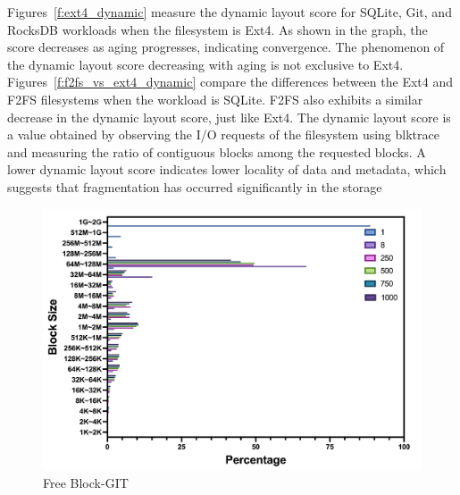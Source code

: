 Figures~\ref{f:ext4_dynamic} measure the dynamic layout score for SQLite, Git, and RocksDB workloads when the filesystem is Ext4.
As shown in the graph, the score decreases as aging progresses, indicating convergence.
The phenomenon of the dynamic layout score decreasing with aging is not exclusive to Ext4.
Figures~\ref{f:f2fs_vs_ext4_dynamic} compare the differences between the Ext4 and F2FS filesystems when the workload is SQLite.
F2FS also exhibits a similar decrease in the dynamic layout score, just like Ext4.
The dynamic layout score is a value obtained by observing the I/O requests of the filesystem using blktrace and measuring the ratio of contiguous blocks among the requested blocks.
A lower dynamic layout score indicates lower locality of data and metadata, which suggests that fragmentation has occurred significantly in the storage~\cite{senescence:fast17}


\begin{figure}[t]
    \centering
	\includegraphics[width=0.95\columnwidth]{graphs/free_block_git}
	\caption{Free Block-GIT}
	\label{f:free_block_git}
\end{figure}


